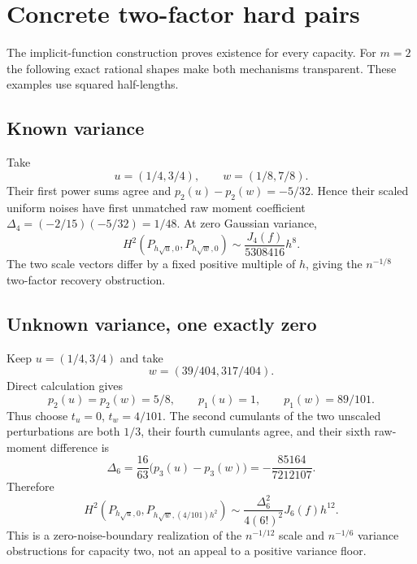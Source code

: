 \documentclass[11pt,a4paper]{article}
\numberwithin{equation}{section}
\theoremstyle{definition}
\theoremstyle{remark}
\begin{document}
\section{Concrete two-factor hard pairs}
\label{sec:examples}

The implicit-function construction proves existence for every capacity.
For $m=2$ the following exact rational shapes make both mechanisms
transparent. These examples use squared half-lengths.

\subsection{Known variance}
Take
\begin{equation}
 u=(1/4,3/4),\qquad w=(1/8,7/8).
 \label{eq:example-known}
\end{equation}
Their first power sums agree and
$p_2(u)-p_2(w)=-5/32$. Hence their scaled uniform noises have first
unmatched raw moment coefficient
$\Delta_4=(-2/15)(-5/32)=1/48$. At zero Gaussian variance,
\begin{equation}
 H^2(P_{h\sqrt u,0},P_{h\sqrt w,0})
 \sim\frac{J_4(f)}{5308416}h^8.
 \label{eq:example-known-H}
\end{equation}
The two scale vectors differ by a fixed positive multiple of $h$, giving
the $n^{-1/8}$ two-factor recovery obstruction.

\subsection{Unknown variance, one exactly zero}
Keep $u=(1/4,3/4)$ and take
\begin{equation}
 w=(39/404,317/404).
 \label{eq:example-unknown}
\end{equation}
Direct calculation gives
\[
 p_2(u)=p_2(w)=5/8,\qquad p_1(u)=1,\qquad p_1(w)=89/101.
\]
Thus choose $t_u=0$, $t_w=4/101$. The second cumulants of the two
unscaled perturbations are both $1/3$, their fourth cumulants agree,
and their sixth raw-moment difference is
\begin{equation}
 \Delta_6=\frac{16}{63}\bigl(p_3(u)-p_3(w)\bigr)
 =-\frac{85164}{7212107}.
 \label{eq:example-delta6}
\end{equation}
Therefore
\begin{equation}
 H^2(P_{h\sqrt u,0},P_{h\sqrt w,(4/101)h^2})
 \sim\frac{\Delta_6^2}{4(6!)^2}J_6(f)h^{12}.
 \label{eq:example-unknown-H}
\end{equation}
This is a zero-noise-boundary realization of the $n^{-1/12}$ scale and
$n^{-1/6}$ variance obstructions for capacity two, not an appeal to a
positive variance floor.
\end{document}
